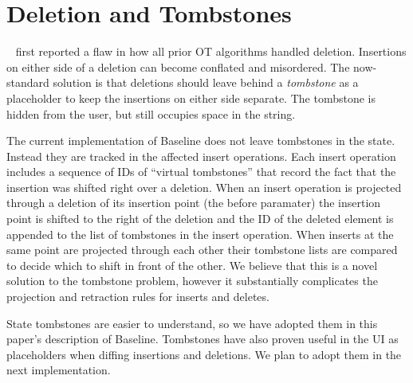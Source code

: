 \documentclass[english,submission]{programming}
\theoremstyle{definition}
\newcommand{\citet}[1]{\citeauthor*{#1}~\cite{#1}}
\begin{document}


\acks

\appendix

\section{Deletion and Tombstones}\label{deletion}

\citet{Oster06} first reported a flaw in how all prior OT algorithms handled deletion. Insertions on either side of a deletion can become conflated and misordered.
The now-standard solution is that deletions should leave behind a \textit{tombstone} as a placeholder to keep the insertions on either side separate. The tombstone is hidden from the user, but still occupies space in the string.

The current implementation of Baseline does not leave tombstones in the state. Instead they are tracked in the affected \textsf{insert} operations. Each insert operation includes a sequence of IDs of ``virtual tombstones'' that record the fact that the insertion was shifted right over a deletion.
When an insert operation is projected through a deletion of its insertion point (the \textsf{before} paramater) the insertion point is shifted to the right of the deletion and the ID of the deleted element is appended to the list of tombstones in the insert operation. When inserts at the same point are projected through each other their tombstone lists are compared to decide which to shift in front of the other. We believe that this is a novel solution to the tombstone problem,
however it substantially complicates the projection and retraction rules for inserts and deletes.

State tombstones are easier to understand, so we have adopted them in this paper's description of Baseline. Tombstones have also proven useful in the UI as placeholders when diffing insertions and deletions. We plan to adopt them in the next implementation.
\end{document}
